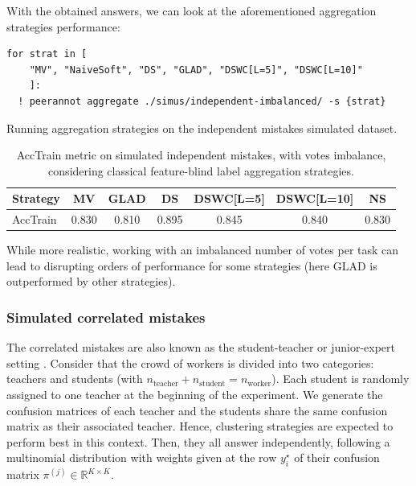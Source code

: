 With the obtained answers, we can look at the aforementioned aggregation strategies performance:

\begin{listing}[H]
    \begin{verbatim}
for strat in [
    "MV", "NaiveSoft", "DS", "GLAD", "DSWC[L=5]", "DSWC[L=10]"
    ]:
  ! peerannot aggregate ./simus/independent-imbalanced/ -s {strat}
    \end{verbatim}
    \caption{Running aggregation strategies on the independent mistakes simulated dataset.}
    \label{lst:indep_mistakes_agg_imbalance}
\end{listing}

\begin{table}[htbp]
    \centering
    \caption{AccTrain metric on simulated independent mistakes, with votes imbalance, considering classical feature-blind label aggregation strategies.}
    \label{tab:accuracy_train_indep}
    \begin{tabular}{|l|c|c|c|c|c|c|}
    \hline
    \textbf{Strategy} & \textbf{MV} & \textbf{GLAD} & \textbf{DS} & \textbf{DSWC[L=5]} & \textbf{DSWC[L=10]} & \textbf{NS} \\
    \hline
    AccTrain & 0.830 &	0.810 &	0.895 	&0.845& 	0.840 &	0.830\\
    \hline
    \end{tabular}
    \end{table}

While more realistic, working with an imbalanced number of votes per task can lead to disrupting orders of performance for some strategies (here GLAD is outperformed by other strategies).

\subsubsection{Simulated correlated mistakes}
The correlated mistakes are also known as the student-teacher or junior-expert setting \citep{maxmig}. Consider that the crowd of workers is divided into two categories: teachers and students (with $n_{\text{teacher}} + n_{\text{student}}=n_{\text{worker}}$). Each student is randomly assigned to one teacher at the beginning of the experiment. We generate the confusion matrices of each teacher and the students share the same confusion matrix as their associated teacher. Hence, clustering strategies are expected to perform best in this context. Then, they all answer independently, following a multinomial distribution with weights given at the row $y_i^\star$ of their confusion matrix $\pi^{(j)}\in\mathbb{R}^{K\times K}$.

